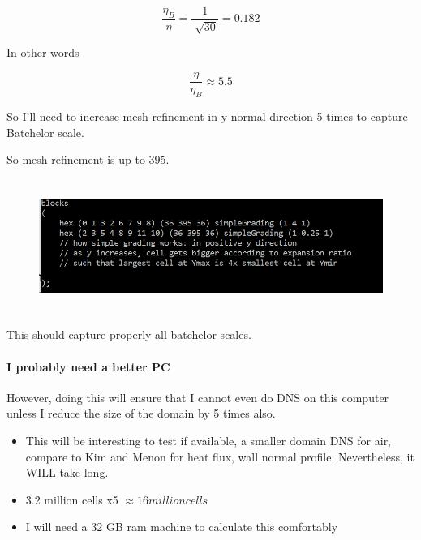 \documentclass[12pt]{article}
\renewcommand{\_}{\kern-1.5pt\textunderscore\kern-1.5pt}
\begin{document}
 \[ \frac{ \eta _{B}}{ \eta }=\frac{1}{\sqrt[]{30}}=0.182 \] \par

In other words\par

 \[ \frac{ \eta }{ \eta _{B}} \approx 5.5 \] \par

So I’ll need to increase mesh refinement in y normal direction 5 times to capture Batchelor scale.\par

So mesh refinement is up to 395.\par




\begin{figure}[H]
	\begin{Center}
		\includegraphics[width=6.27in,height=1.71in]{./media/image22.png}
	\end{Center}
\end{figure}



\par

This should capture properly all batchelor scales.\par
\paragraph{I probably need a better PC} \par 


However, doing this will ensure that I cannot even do DNS on this computer unless I reduce the size of the domain by 5 times also.\par


\begin{itemize}
	\item This will be interesting to test if available, a smaller domain DNS for air, compare to Kim and Menon for heat flux, wall normal profile. Nevertheless, it WILL take long.\par

	\item 3.2 million cells x5  \(  \approx 16 million cells \) \par

	\item I will need a 32 GB ram machine to calculate this comfortably\par
\end{itemize}
\end{document}
